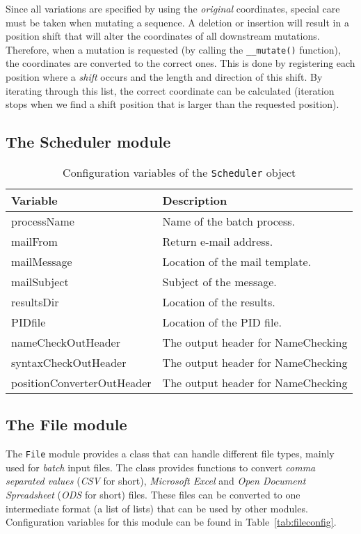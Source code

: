 \documentclass{article}
\begin{document}
Since all variations are specified by using the \emph{original} coordinates,
special care must be taken when mutating a sequence. A deletion or insertion
will result in a position shift that will alter the coordinates of all
downstream mutations. Therefore, when a mutation is requested (by calling the
\texttt{\_\_mutate()} function), the coordinates are converted to the correct
ones. This is done by registering each position where a \emph{shift} occurs 
and the length and direction of this shift. By iterating through this list, the
correct coordinate can be calculated (iteration stops when we find a shift
position that is larger than the requested position).

\subsection{The Scheduler module} \label{subsec:scheduler}

\begin{table}[H]
\begin{center}
\begin{tabular}{l|l}
Variable                   & Description \\
\hline
processName                & Name of the batch process. \\
mailFrom                   & Return e-mail address. \\
mailMessage                & Location of the mail template. \\
mailSubject                & Subject of the message. \\
resultsDir                 & Location of the results. \\
PIDfile                    & Location of the PID file. \\
nameCheckOutHeader         & The output header for NameChecking \\
syntaxCheckOutHeader       & The output header for NameChecking \\
positionConverterOutHeader & The output header for NameChecking 
\end{tabular}
\caption{Configuration variables of the \texttt{Scheduler} object} 
\label{tab:schedulerconfig}
\end{center}
\end{table}

\subsection{The File module} \label{subsec:file}
The \texttt{File} module provides a class that can handle different file types,
mainly used for \emph{batch} input files. The class provides functions to
convert \emph{comma separated values} (\emph{CSV} for short), \emph{Microsoft
Excel} and \emph{Open Document Spreadsheet} (\emph{ODS} for short) files. These
files can be converted to one intermediate format (a list of lists) that can be
used by other modules. Configuration variables for this module can be found in
Table~\ref{tab:fileconfig}.
\end{document}
